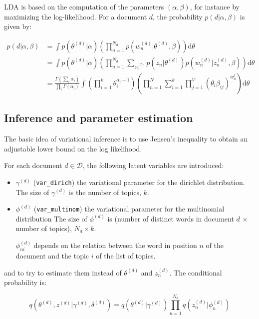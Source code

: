 \documentclass{article}
\begin{document}
LDA is based on the computation of the parameters $(\alpha, \beta)$, for instance by maximizing the log-likelihood. For a document $d$, the probability $p(d|\alpha, \beta)$ is given by:

\begin{align*}
p(d|\alpha, \beta) 
& = \int p(\theta^{(d)}|\alpha) \left( \prod_{n=1}^{N_{d}} p(w_n^{(d)}|\theta^{(d)}, \beta)\right) \text{d}\theta  \\
& = \int p(\theta^{(d)}|\alpha) \left( \prod_{n=1}^{N_{d}} \sum_{z_n^{(d)}} p(z_n|\theta^{(d)}) p(w_n^{(d)}|z_n^{(d)}, \beta)\right) \text{d}\theta  \\
& = \frac{\Gamma\left( \sum_i \alpha_i\right)}{\prod_i \Gamma(\alpha_i)} \int \left( \prod_{i=1}^k \theta_i^{\alpha_i - 1} \right) \left( \prod_{n=1}^N \sum_{i=1}^k \prod_{j=1}^V (\theta_i \beta_{ij})^{w_n^j} \right) \text{d}\theta
\end{align*}

\subsection{Inference and parameter estimation}

The basic idea of variational inference is to use Jensen's inequality to obtain an adjustable lower bound on the log likelihood.

For each document $d \in \mathcal{D}$, the following latent variables are introduced:
 \begin{itemize}
\setlength\itemsep{-0.2em}
  \item $\gamma^{(d)}$ (\verb"var_dirich") the variational parameter for the dirichlet distribution. The size of $\gamma^{(d)}$ is the number of topics, $k$.
  \item $\phi^{(d)}$ (\verb"var_multinom") the variational parameter for the multinomial distribution The size of $\phi^{(d)}$ is (number of distinct words in document $d$ $\times$ number of topics), $N_d \times k$.
  
  $\phi_{ni}^{(d)}$ depends on the relation between the word in position $n$ of the document and the topic $i$ of the list of topics.
   \end{itemize}

and to try to estimate them instead of $\theta^{(d)}$ and $z_n^{(d)}$. The conditional probability is:

\[ q(\theta^{(d)}, z^{(d)}|\gamma^{(d)}, \delta^{(d)}) = q(\theta^{(d)}|\gamma^{(d)}) \prod_{n=1}^{N_d} q(z_n^{(d)}|\phi_n^{(d)})\]
\end{document}
